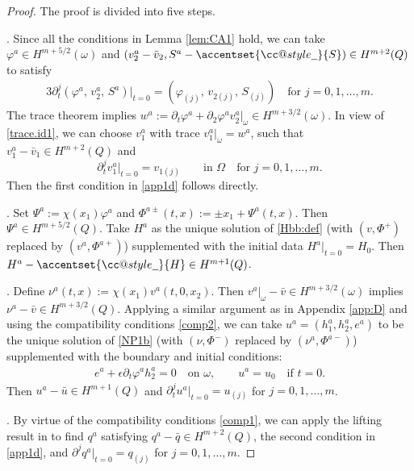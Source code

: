 \documentclass[twoside,11pt]{article}
\makeatletter
\numberwithin{equation}{section}
\def\p{\partial}
\def\widebar{\accentset{{\cc@style\underline{\mskip10mu}}}}
\makeatother
\begin{document}
\begin{proof}
	The proof is divided into five steps.
	
	\vspace*{2mm}
	.\quad
	Since all the conditions in Lemma \ref{lem:CA1} hold, we can
	take $\varphi^a\in H^{m+5/2}(\omega)$
	and $(v_2^{a}-\bar{v}_2, {S}^{a}-\widebar{S})\in H^{m+2}(Q)$
	to satisfy	
	\begin{alignat*}{3}
		\p_t^{j}(\varphi^a, \, v_2^{a},\,  {S}^{a})\big|_{t=0}
		=(\varphi_{(j)},\, v_{2(j)},\,  S_{(j)})
		\quad \textrm{for } j=0,1,\ldots,m.	
	\end{alignat*}
	The trace theorem implies
	$ w^a:=\p_t\varphi^a +  \p_2\varphi^a v_2^{a} |_{\omega} \in  H^{m+3/2}(\omega). $
	In view of \eqref{trace.id1},
	we can choose $v_1^{a}$ with trace
	$v_1^{a}|_{\omega} =w^a$, such that
	$ v_1^{a}-\bar{v}_1\in H^{m+2}(Q)$ and
	$$
	\p_t^{j}v_1^{a}\big|_{t=0}=v_{1(j)}\qquad \textrm{in } \Omega \quad
	\textrm{for } j=0,1, \ldots,m.$$
	Then the first condition in \eqref{app1d} follows  directly.
	
	\vspace*{2mm}
	.\quad	
	Set $\Psi^{a}:=\chi( x_1)\varphi^{a} $
	and $\Phi^{a\pm }(t,x):= \pm x_1 +\Psi^{a }(t,x) $.
	Then $\Psi^a \in  H^{m+5/2}(Q)$.
	Take ${H}^{a}$ as the unique solution of \eqref{Hbb:def} (with $( {v}, {\Phi}^+)$ replaced by $(v^a,\Phi^{a+})$)
	supplemented with the initial data ${H}^{a}|_{t=0}={H}_{0}.$
	Then ${H}^{a}-\widebar{H}\in H^{{m+1}}(Q)$.
	
	\vspace*{2mm}
	.\quad	
	Define
	$\nu^a(t,x):=\chi(x_1)v^a(t,0, x_2)$.
	Then $v^{a}|_{\omega}-\bar{v}\in H^{m+3/2}(\omega)$ implies
	$\nu^{a}-\bar{v}\in H^{m+3/2}(Q)$.
	{Applying a similar argument as in Appendix \ref{app:D} and using the compatibility conditions \eqref{comp2},
		we can take $u^a=(h_1^a, h_2^a, e^a)$ to be the unique solution of \eqref{NP1b}
		(with $( {\nu}, {\Phi}^-)$ replaced by $(\nu^a,\Phi^{a-})$)
		 supplemented with the boundary and initial conditions:}
	\begin{align*}
		e^a+\epsilon \p_t \varphi^a  h_2^a=0\quad \textrm{on }\omega,\qquad {u}^{a}={u}_{0}\quad \textrm{if }t=0.
	\end{align*}
	Then $u^a-\bar{u}\in H^{m+1}(Q)$
	and $\p_t^{j}u^{a}|_{t=0}=u_{(j)}$ for $j=0,1, \ldots,m$.
	
	
	\vspace*{2mm}
	.\quad		
	By virtue of the compatibility conditions \eqref{comp1},
	we can apply the lifting result in \cite[Theorem 2.3]{LM72MR0350178}
	to find ${q}^{a}$ satisfying ${q}^{a}-\bar{q}\in H^{m+2}(Q)$,
	the second condition in \eqref{app1d}, and
	$\p^{j} {q}^{a}  |_{t=0}= {q}_{(j)}$ for $j=0,1, \ldots,m$.
	

\end{proof}
\end{document}
